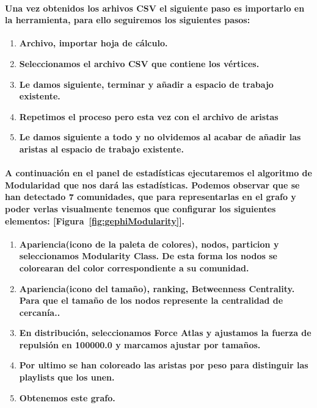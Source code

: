 \documentclass[11pt,spanish]{article}
\begin{document}
\paragraph*{Una vez obtenidos los arhivos CSV el siguiente paso es importarlo en la herramienta, para ello seguiremos los siguientes pasos:}
\begin{enumerate}
	\item \textbf{Archivo, importar hoja de cálculo.}
	\item \textbf{Seleccionamos el archivo CSV que contiene los vértices.}
	\item \textbf{Le damos siguiente, terminar y añadir a espacio de trabajo existente.}
	\item \textbf{Repetimos el proceso pero esta vez con el archivo de aristas}
	\item \textbf{Le damos siguiente a todo y no olvidemos al acabar de añadir las aristas al espacio de trabajo existente.}
\end{enumerate}

\paragraph*{A continuación en el panel de estadísticas ejecutaremos el algoritmo de Modularidad que nos dará las estadísticas. 
Podemos observar que se han detectado 7 comunidades, que para representarlas en el grafo y poder verlas visualmente tenemos que configurar los siguientes elementos: [Figura~\ref{fig:gephiModularity}].}
\begin{enumerate}
	\item \textbf{Apariencia(icono de la paleta de colores), nodos, particion y seleccionamos Modularity Class. De esta forma los nodos se colorearan del color correspondiente a su comunidad.}
	\item \textbf{Apariencia(icono del tamaño), ranking, Betweenness Centrality. Para que el tamaño de los nodos represente la centralidad de cercanía..}
	\item \textbf{En distribución, seleccionamos Force Atlas y ajustamos la fuerza de repulsión en 100000.0 y marcamos ajustar por tamaños.}
	\item \textbf{Por ultimo se han coloreado las aristas por peso para distinguir las playlists que los unen.}
	\item \textbf{Obtenemos este grafo. }
\end{enumerate}
\end{document}

